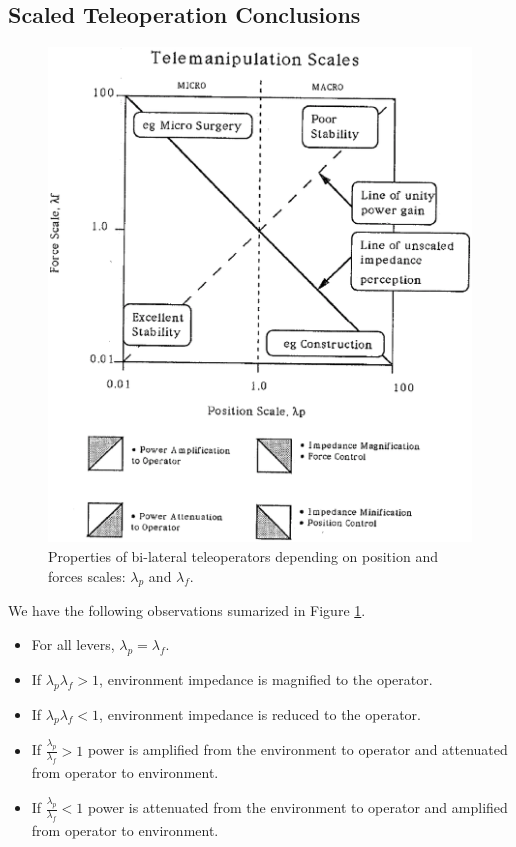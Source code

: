 \subsection{Scaled Teleoperation Conclusions}	%


\begin{figure}[h]	%
\centering \includegraphics[width=5in]{figs14/lambdachart.eps}
\caption{Properties of bi-lateral teleoperators depending on position and forces scales: $\lambda_p$ and $\lambda_f$.}\label{LambdaChart}	%
\end{figure}	%


We have the following observations
sumarized in Figure \ref{LambdaChart}.	%
\begin{itemize}
  \item For all levers, $\lambda_p = \lambda_f$.

   \item If $\lambda_p\lambda_f > 1$, environment impedance is magnified to the operator.

   \item If $\lambda_p\lambda_f < 1$, environment impedance is reduced   to the operator.

   \item If $\frac{\lambda_p}{\lambda_f} > 1$ power is amplified from the environment to operator  and attenuated from operator to environment.

   \item If $\frac{\lambda_p}{\lambda_f} < 1$ power is attenuated from the environment to operator  and amplified from operator to environment.
\end{itemize}


